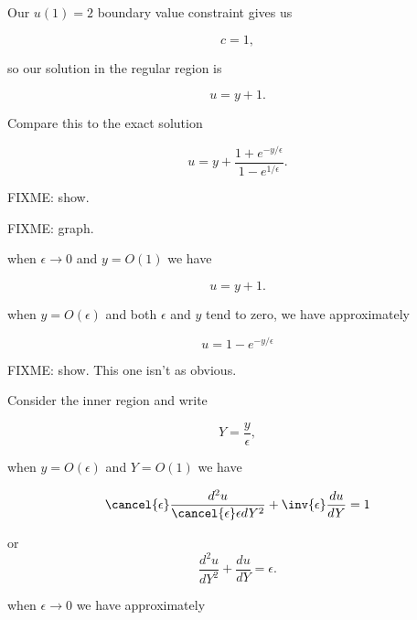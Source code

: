Our $u(1) = 2$ boundary value constraint gives us

\begin{equation}\label{eqn:continuumL20:n}
c = 1,
\end{equation}

so our solution in the regular region is

\begin{equation}\label{eqn:continuumL20:n}
u = y + 1.
\end{equation}

Compare this to the exact solution

\begin{equation}\label{eqn:continuumL20:310}
u = y + \frac{1 + e^{-y/\epsilon}}{1 - e^{1/\epsilon}}.
\end{equation}

FIXME: show.

FIXME: graph.

when $\epsilon \rightarrow 0$ and $y = O(1)$ we have

\begin{equation}\label{eqn:continuumL20:330}
u = y + 1.
\end{equation}

when $y = O(\epsilon)$ and both $\epsilon$ and $y$ tend to zero, we have approximately

\begin{equation}\label{eqn:continuumL20:350}
u = 1 - e^{-y/\epsilon}
\end{equation}

FIXME: show.  This one isn't as obvious.

Consider the inner region and write

\begin{equation}\label{eqn:continuumL20:n}
Y = \frac{y}{\epsilon},
\end{equation}

when $y = O(\epsilon)$ and $Y = O(1)$ we have

\begin{equation}\label{eqn:continuumL20:n}
\cancel{\epsilon} \frac{d^2 u}{\cancel{\epsilon} \epsilon dY^2} + \inv{\epsilon} \frac{du}{dY} = 1
\end{equation}

or
\begin{equation}\label{eqn:continuumL20:n}
\frac{d^2 u}{dY^2} + \frac{du}{dY} = \epsilon.
\end{equation}

when $\epsilon \rightarrow 0$ we have approximately

